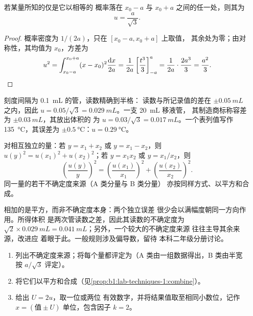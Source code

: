 \begin{proposition}\label{prop:b1:lab-techniques-1:type-b}
若某量所知的仅是它以相等的
概率落在 $x_0 - a$ 与 $x_0 + a$ 之间的任一处，则其为
\[
  u = \frac{a}{\sqrt3}.
\]
\end{proposition}
\begin{proof}
概率密度为 $1/(2a)$，只在 $[x_0 - a, x_0 + a]$ 上取值，
其余处为零；由对称性，其均值为 $x_0$，方差为
\[
  u^2 = \int_{x_0-a}^{x_0+a} (x - x_0)^2 \frac{\mathrm{d}x}{2a}
      = \frac{1}{2a} \left[\frac{t^3}{3}\right]_{-a}^{a}
      = \frac{1}{2a}\cdot\frac{2a^3}{3} = \frac{a^2}{3}. \qedhere
\]
\end{proof}

\begin{example}[一次读数与容差]
刻度间隔为 \qty{0.1}{mL} 的管，读数精确到半格：
读数与所记录值的差在 $\pm\qty{0.05}{mL}$ 之内，因此
$u = 0.05/\sqrt3 = \qty{0.029}{mL}$。一支 \qty{20}{mL} 移液管，
其制造商标称容差为 $\pm\qty{0.03}{mL}$，其放出体积的
为 $u = 0.03/\sqrt3 = \qty{0.017}{mL}$。一个表列值写作
\qty{135}{\celsius}，其误差为 $\pm\qty{0.5}{\celsius}$：$u = \qty{0.29}{\celsius}$。
\end{example}

\begin{proposition}[不确定度的合成]\label{prop:b1:lab-techniques-1:combine}
对相互独立的量：若 $y = x_1 + x_2$ 或 $y = x_1 - x_2$，则
$u(y)^2 = u(x_1)^2 + u(x_2)^2$；若 $y = x_1 x_2$ 或 $y = x_1/x_2$，则
\[
  \left(\frac{u(y)}{y}\right)^2 = \left(\frac{u(x_1)}{x_1}\right)^2
  + \left(\frac{u(x_2)}{x_2}\right)^2 .
\]
同一量的若干不确定度来源（A 类分量与 B 类分量）
亦按同样方式、以平方和合成。
\end{proposition}
\admitted

相加的是平方，而非不确定度本身：两个独立误差
很少会以满幅度朝同一方向作用。所得体积
是两次管读数之差，因此其读数的不确定度为
$\sqrt2 \times \qty{0.029}{mL} = \qty{0.041}{mL}$；另外，一个较大的不确定度来源
往往主导其余来源，改进应
着眼于此。一般规则涉及偏导数，留待
本科二年级分册讨论。

\begin{method}[结果的报告]\label{met:b1:lab-techniques-1:report-result}
\begin{enumerate}
  \item 列出不确定度来源；将每个量都评定为（A 类由一组数据得出，B 类由半宽
        按 $a/\sqrt3$ 评定）。
  \item 将它们以平方和合成（见\cref{prop:b1:lab-techniques-1:combine}）。
  \item 给出 $U = 2u$，取一位或两位
        有效数字，并将结果值取至相同小数位，记作
        $x = (\text{值} \pm U)$ 单位，包含因子 $k = 2$。
\end{enumerate}
\end{method}

